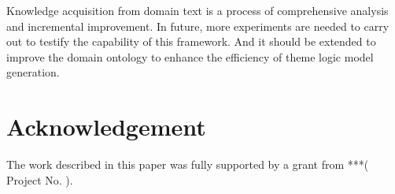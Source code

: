 \documentclass{elsarticle}
\begin{document}
Knowledge acquisition from domain text is a process of comprehensive
analysis and incremental improvement. In future, more experiments are
needed to carry out to testify the capability of this framework. And
it should be extended to improve the domain ontology to enhance the
efficiency of theme logic model generation.

\section{Acknowledgement}
\label{sec:acknowledgement}

The work described in this paper was fully supported by a grant from ***( Project No.  ). 





\end{document}
